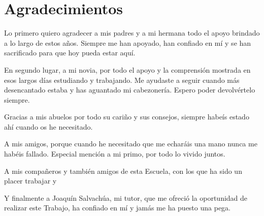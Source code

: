 \chapter*{Agradecimientos}
\justifying

Lo primero quiero agradecer a mis padres y a mi hermana todo el apoyo brindado a lo largo de estos años. Siempre me han apoyado, han confiado en mí y se han sacrificado para que hoy pueda estar aquí.

En segundo lugar, a mi novia, por todo el apoyo y la comprensión mostrada en esos largos días estudiando y trabajando. Me ayudaste a seguir cuando más desencantado estaba y has aguantado mi cabezonería. Espero poder devolvértelo siempre.

Gracias a mis abuelos por todo su cariño y sus consejos, siempre habeís estado ahí cuando os he necesitado.

A mis amigos, porque cuando he necesitado que me echaráis una mano nunca me habéis fallado. Especial mención a mi primo, por todo lo vivido juntos.

A mis compañeros y también amigos de esta Escuela, con los que ha sido un placer trabajar y 

Y finalmente a Joaquín Salvachúa, mi tutor, que me ofreció la oportunidad de realizar este Trabajo, ha confiado en mí y jamás me ha puesto una pega.